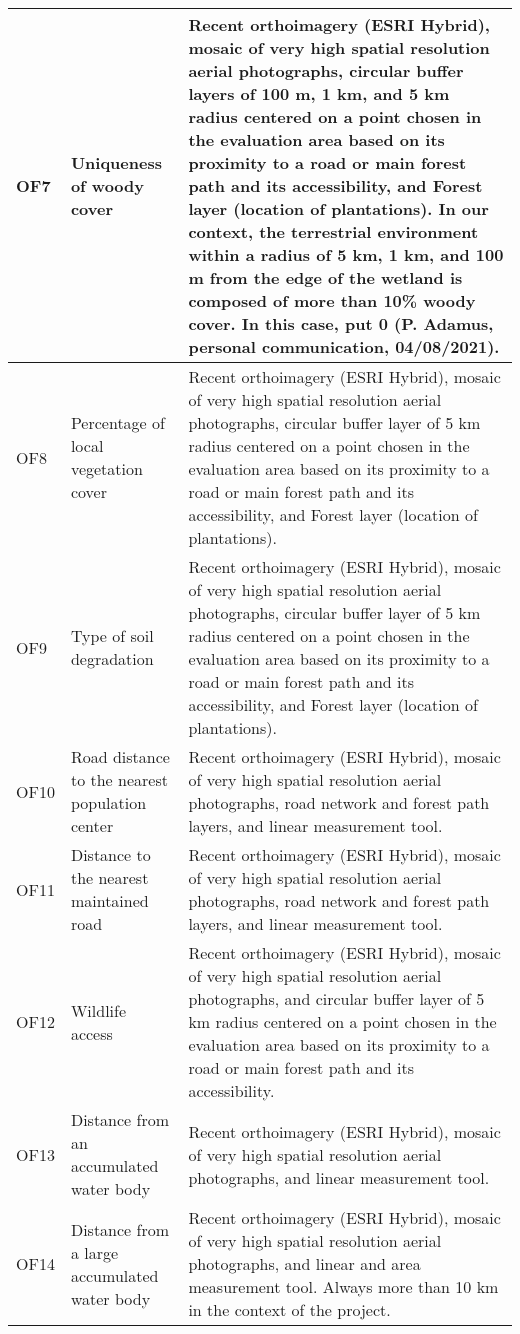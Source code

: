 \begin{longtable}{|l|p{3cm}|p{10cm}|}
    OF7 & Uniqueness of woody cover & Recent orthoimagery (ESRI Hybrid), mosaic of very high spatial resolution aerial photographs, circular buffer layers of 100 m, 1 km, and 5 km radius centered on a point chosen in the evaluation area based on its proximity to a road or main forest path and its accessibility, and Forest layer (location of plantations). In our context, the terrestrial environment within a radius of 5 km, 1 km, and 100 m from the edge of the wetland is composed of more than 10\% woody cover. In this case, put 0 (P. Adamus, personal communication, 04/08/2021). \\ \hline
    OF8 & Percentage of local vegetation cover & Recent orthoimagery (ESRI Hybrid), mosaic of very high spatial resolution aerial photographs, circular buffer layer of 5 km radius centered on a point chosen in the evaluation area based on its proximity to a road or main forest path and its accessibility, and Forest layer (location of plantations). \\ \hline
    OF9 & Type of soil degradation & Recent orthoimagery (ESRI Hybrid), mosaic of very high spatial resolution aerial photographs, circular buffer layer of 5 km radius centered on a point chosen in the evaluation area based on its proximity to a road or main forest path and its accessibility, and Forest layer (location of plantations). \\ \hline
    OF10 & Road distance to the nearest population center & Recent orthoimagery (ESRI Hybrid), mosaic of very high spatial resolution aerial photographs, road network and forest path layers, and linear measurement tool. \\ \hline
    OF11 & Distance to the nearest maintained road & Recent orthoimagery (ESRI Hybrid), mosaic of very high spatial resolution aerial photographs, road network and forest path layers, and linear measurement tool. \\ \hline
    OF12 & Wildlife access & Recent orthoimagery (ESRI Hybrid), mosaic of very high spatial resolution aerial photographs, and circular buffer layer of 5 km radius centered on a point chosen in the evaluation area based on its proximity to a road or main forest path and its accessibility. \\ \hline
    OF13 & Distance from an accumulated water body & Recent orthoimagery (ESRI Hybrid), mosaic of very high spatial resolution aerial photographs, and linear measurement tool. \\ \hline
    OF14 & Distance from a large accumulated water body & Recent orthoimagery (ESRI Hybrid), mosaic of very high spatial resolution aerial photographs, and linear and area measurement tool. Always more than 10 km in the context of the project. \\ \hline

\end{longtable}
